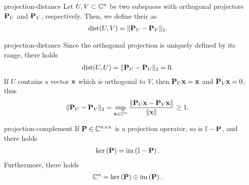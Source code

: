 \begin{Definition}{projection-distance}
  Let $U,V\subset \mathbb C^n$ be two subspaces with orthogonal projectors
  $\mathbf P_U$ and $\mathbf P_V$, respectively. Then, we define their
   as
  \begin{gather}
    \operatorname{dist}(U,V) = \lVert\mathbf P_U-\mathbf P_V\rVert_2.
  \end{gather}
\end{Definition}

\begin{Example}{projection-distance}
  Since the orthogonal projection is uniquely defined by its range, there holds
  \begin{gather}
    \operatorname{dist}(U,U) = \lVert\mathbf P_U-\mathbf P_U\rVert_2 = 0.
  \end{gather}
  If $U$ contains a vector $\mathbf x$  which is orthogonal to $V$, then $\mathbf P_U\mathbf x=\mathbf x$ and $\mathbf P_V\mathbf x = 0$, thus
  \begin{gather}
    \lVert\mathbf P_U-\mathbf P_V\rVert_2 = \sup_{\mathbf x\in\mathbb C^n} \frac{\lVert\mathbf P_U\mathbf x-\mathbf P_V\mathbf x\rVert}{\lVert\mathbf x\rVert} \ge 1.
  \end{gather}
\end{Example}



\begin{Lemma}{projection-complement}
  If $\mathbf P\in\mathbb C^{n\times n}$ is a projection operator, so is
  $\mathbb I-\mathbf P$, and there holds
  \begin{gather}
    \operatorname{ker}\left(\mathbf P\right) = \operatorname{im}\left(\mathbb I-\mathbf P\right).
  \end{gather}
  Furthermore, there holds
  \begin{gather}
    \mathbb C^n = \operatorname{ker}\left(\mathbf P\right) \oplus \operatorname{im}\left(\mathbf P\right).
  \end{gather}
\end{Lemma}

